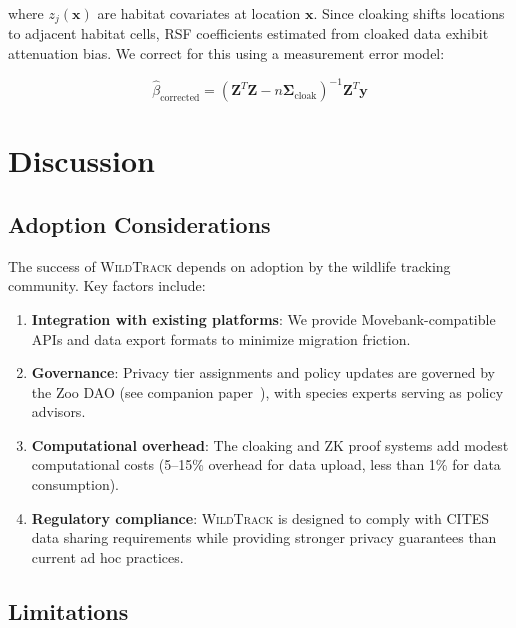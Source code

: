 \documentclass[11pt,letterpaper]{article}
\newcommand{\WildTrack}{\textsc{WildTrack}}
\begin{document}
where $z_j(\mathbf{x})$ are habitat covariates at location $\mathbf{x}$. Since cloaking shifts locations to adjacent habitat cells, RSF coefficients estimated from cloaked data exhibit attenuation bias. We correct for this using a measurement error model:

\begin{equation}
\hat{\beta}_{\text{corrected}} = (\mathbf{Z}^T \mathbf{Z} - n\boldsymbol{\Sigma}_{\text{cloak}})^{-1} \mathbf{Z}^T \mathbf{y}
\end{equation}

\section{Discussion}

\subsection{Adoption Considerations}

The success of \WildTrack{} depends on adoption by the wildlife tracking community. Key factors include:

\begin{enumerate}[leftmargin=*]
    \item \textbf{Integration with existing platforms}: We provide Movebank-compatible APIs and data export formats to minimize migration friction.
    \item \textbf{Governance}: Privacy tier assignments and policy updates are governed by the Zoo DAO (see companion paper~\cite{zoo2026dao}), with species experts serving as policy advisors.
    \item \textbf{Computational overhead}: The cloaking and ZK proof systems add modest computational costs (5--15\% overhead for data upload, less than 1\% for data consumption).
    \item \textbf{Regulatory compliance}: \WildTrack{} is designed to comply with CITES data sharing requirements while providing stronger privacy guarantees than current ad hoc practices.
\end{enumerate}

\subsection{Limitations}
\end{document}
